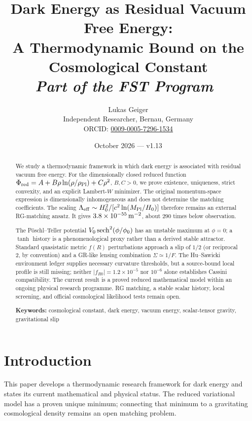 \documentclass[12pt,a4paper]{article}
\title{\textbf{Dark Energy as Residual Vacuum Free Energy:\\
A Thermodynamic Bound on the Cosmological Constant}\\
\large\textit{Part of the FST Program~\cite{GeigerFST-Hub-2026}}}
\author{Lukas Geiger\\
\small Independent Researcher, Bernau, Germany\\
\small ORCID: \href{https://orcid.org/0009-0005-7296-1534}{0009-0005-7296-1534}}
\date{October 2026 --- v1.13}
\theoremstyle{definition}
\theoremstyle{plain}
\theoremstyle{remark}
\begin{document}
\maketitle
\vspace{-3.2em}

\begin{abstract}\small
We study a thermodynamic framework in which dark energy is associated with
residual vacuum free energy. For the dimensionally closed reduced function
\(\Phi_{\rm red}=A+B\rho\ln(\rho/\rho_{\rm Pl})+C\rho^2\), \(B,C>0\),
we prove existence, uniqueness, strict convexity, and an explicit Lambert-\(W\)
minimizer. The original momentum-space expression is dimensionally
inhomogeneous and does not determine the matching coefficients.
The scaling \(\Lambda_{\rm eff}\sim H_0^2/[c^2\ln(M_{\rm Pl}/H_0)]\)
therefore remains an external RG-matching ansatz. It gives
\(3.8\times10^{-55}\,{\rm m}^{-2}\), about \(290\) times below observation.

The Pöschl--Teller potential \(V_0\,{\rm sech}^2(\phi/\phi_0)\) has an
unstable maximum at \(\phi=0\); a \(\tanh\) history is a phenomenological
proxy rather than a derived stable attractor. Standard quasistatic metric
\(f(R)\) perturbations approach a slip of \(1/2\) (or reciprocal \(2\),
by convention) and a GR-like lensing combination \(\Sigma\simeq1/F\).
The Hu--Sawicki environment ledger supplies necessary curvature thresholds,
but a source-bound local profile is still missing; neither
\(|f_{R0}|=1.2\times10^{-5}\) nor \(10^{-6}\) alone establishes Cassini
compatibility. The current result is a proved reduced mathematical model
within an ongoing physical research programme. RG matching, a stable scalar
history, local screening, and official cosmological likelihood tests remain open.
\par\vspace{0.6em}
\noindent\textbf{Keywords:} cosmological constant, dark energy, vacuum energy,
scalar-tensor gravity, gravitational slip
\end{abstract}

\clearpage
\tableofcontents
\clearpage
\section{Introduction}\label{sec:intro}

This paper develops a thermodynamic research framework for dark energy and
states its current mathematical and physical status. The reduced variational
model has a proven unique minimum; connecting that minimum to a gravitating
cosmological density remains an open matching problem.
\end{document}
